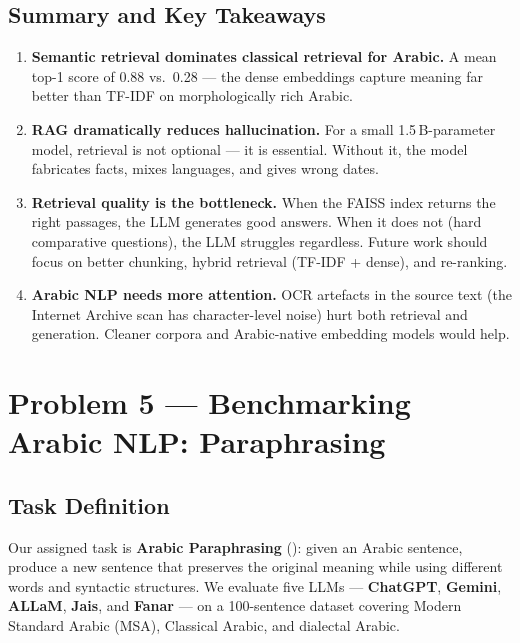 \documentclass[12pt, a4paper]{article}
\newcommand{\arb}[1]{{\arabicfont\RLE{#1}}}
\begin{document}
\subsection{Summary and Key Takeaways}

\begin{enumerate}
    \item \textbf{Semantic retrieval dominates classical retrieval for Arabic.}
          A mean top-1 score of 0.88 vs.\ 0.28 --- the dense embeddings
          capture meaning far better than TF-IDF on morphologically rich Arabic.

    \item \textbf{RAG dramatically reduces hallucination.}
          For a small 1.5\,B-parameter model, retrieval is not optional ---
          it is essential.  Without it, the model fabricates facts, mixes
          languages, and gives wrong dates.

    \item \textbf{Retrieval quality is the bottleneck.}
          When the FAISS index returns the right passages, the LLM generates
          good answers.  When it does not (hard comparative questions), the
          LLM struggles regardless.  Future work should focus on better
          chunking, hybrid retrieval (TF-IDF + dense), and re-ranking.

    \item \textbf{Arabic NLP needs more attention.}
          OCR artefacts in the source text (the Internet Archive scan has
          character-level noise) hurt both retrieval and generation.
          Cleaner corpora and Arabic-native embedding models would help.
\end{enumerate}

\section{Problem 5 --- Benchmarking Arabic NLP: Paraphrasing}

\subsection{Task Definition}

Our assigned task is \textbf{Arabic Paraphrasing} (\arb{إعادة الصياغة}):
given an Arabic sentence, produce a new sentence that preserves the original
meaning while using different words and syntactic structures.
We evaluate five LLMs --- \textbf{ChatGPT}, \textbf{Gemini}, \textbf{ALLaM},
\textbf{Jais}, and \textbf{Fanar} --- on a 100-sentence dataset covering
Modern Standard Arabic (MSA), Classical Arabic, and dialectal Arabic.
\end{document}
